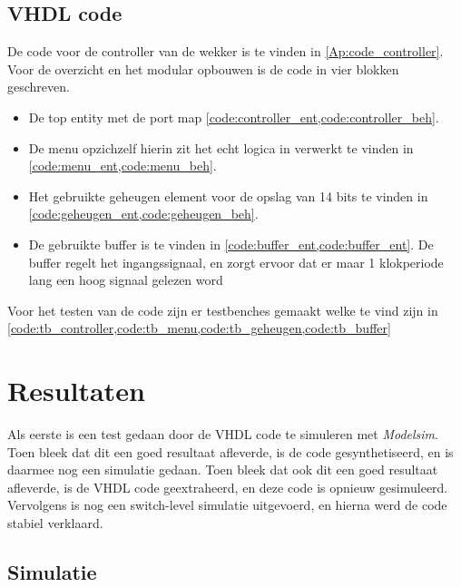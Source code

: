 \subsection{VHDL code}
De code voor de controller van de wekker is te vinden in \cref{Ap:code_controller}. Voor de overzicht en het modular opbouwen is de code in vier blokken geschreven.
\begin{itemize}[nolistsep]
\item De top entity met de port map \cref{code:controller_ent,code:controller_beh}.
\item De menu opzichzelf hierin zit het echt logica in verwerkt te vinden in \cref{code:menu_ent,code:menu_beh}.
\item Het gebruikte geheugen element voor de opslag van 14 bits te vinden in \cref{code:geheugen_ent,code:geheugen_beh}.
\item De gebruikte buffer is te vinden in \cref{code:buffer_ent,code:buffer_ent}. De buffer regelt het ingangssignaal, en zorgt ervoor dat er maar 1 klokperiode lang een hoog signaal gelezen word
\end{itemize}
Voor het testen van de code zijn er testbenches gemaakt welke te vind zijn in \cref{code:tb_controller,code:tb_menu,code:tb_geheugen,code:tb_buffer}
\section{Resultaten}
Als eerste is een test gedaan door de VHDL code te simuleren met \emph{Modelsim}. Toen bleek dat dit een goed resultaat afleverde, is de code gesynthetiseerd, en is daarmee nog een simulatie gedaan. Toen bleek dat ook dit een goed resultaat afleverde, is de VHDL code geextraheerd, en deze code is opnieuw gesimuleerd. Vervolgens is nog een switch-level simulatie uitgevoerd, en hierna werd de code stabiel verklaard.

\subsection{Simulatie}

